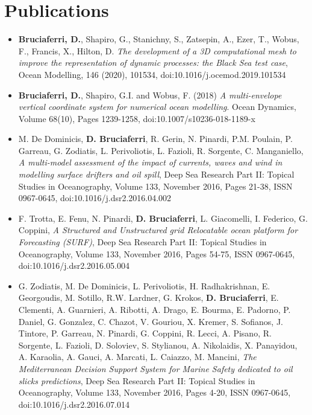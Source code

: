 \documentclass[a4paper, oneside, final]{scrartcl}
\begin{document}
\newpage

\section{Publications}
\noindent
\normalsize

\begin{itemize}
\item \textbf{Bruciaferri, D.}, Shapiro, G., Stanichny, S., Zatsepin, A., Ezer, T., Wobus, F., Francis, X., Hilton, D. \textit{The development of a 3D computational mesh to improve the representation of dynamic processes: the Black Sea test case}, Ocean Modelling, 146 (2020), 101534, doi:10.1016/j.ocemod.2019.101534
\item \textbf{Bruciaferri, D.}, Shapiro, G.I. and Wobus, F. (2018) \textit{A multi-envelope vertical coordinate system for numerical ocean modelling}. Ocean Dynamics, Volume 68(10), Pages 1239-1258, doi:10.1007/s10236-018-1189-x  
\item M. De Dominicis, \textbf{D. Bruciaferri}, R. Gerin, N. Pinardi, P.M. Poulain, P. Garreau, G. Zodiatis, L. Perivoliotis, L. Fazioli, R. Sorgente, C. Manganiello, \textit{A multi-model assessment of the impact of currents, waves and wind in modelling surface drifters and oil spill}, Deep Sea Research Part II: Topical Studies in Oceanography, Volume 133, November 2016, Pages 21-38, ISSN 0967-0645, doi:10.1016/j.dsr2.2016.04.002 
\item F. Trotta, E. Fenu, N. Pinardi, \textbf{D. Bruciaferri}, L. Giacomelli, I. Federico, G. Coppini, \textit{A Structured and Unstructured grid Relocatable ocean platform for Forecasting (SURF)}, Deep Sea Research Part II: Topical Studies in Oceanography, Volume 133, November 2016, Pages 54-75, ISSN 0967-0645, doi:10.1016/j.dsr2.2016.05.004
\item G. Zodiatis, M. De Dominicis, L. Perivoliotis, H. Radhakrishnan, E. Georgoudis, M. Sotillo, R.W. Lardner, G. Krokos, \textbf{D. Bruciaferri}, E. Clementi, A. Guarnieri, A. Ribotti, A. Drago, E. Bourma, E. Padorno, P. Daniel, G. Gonzalez, C. Chazot, V. Gouriou, X. Kremer, S. Sofianos, J. Tintore, P. Garreau, N. Pinardi, G. Coppini, R. Lecci, A. Pisano, R. Sorgente, L. Fazioli, D. Soloviev, S. Stylianou, A. Nikolaidis, X. Panayidou, A. Karaolia, A. Gauci, A. Marcati, L. Caiazzo, M. Mancini, \textit{The Mediterranean Decision Support System for Marine Safety dedicated to oil slicks predictions}, Deep Sea Research Part II: Topical Studies in Oceanography, Volume 133, November 2016, Pages 4-20, ISSN 0967-0645, doi:10.1016/j.dsr2.2016.07.014
\end{itemize}
\end{document}
